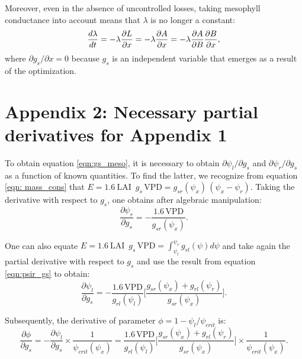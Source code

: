 \documentclass[utf8]{frontiersSCNS} %
\begin{document}
Moreover, even in the absence of uncontrolled losses, taking mesophyll conductance into account means that $\lambda$ is no longer a constant:
\begin{equation}
    \label{eqn:lam_meso}
    \frac{d \lambda}{dt} =-\lambda \frac{\partial L}{\partial x}\\
    = - \lambda \frac{\partial A}{\partial x}
    = - \lambda \frac{\partial A}{\partial B} \frac{\partial B}{\partial x},
\end{equation}
where $\partial g_s / \partial x=0$ because $g_s$ is an independent variable that emerges as a result of the optimization.

\section*{Appendix 2: Necessary partial derivatives for Appendix 1}

To obtain equation \ref{eqn:gs_meso}, it is necessary to obtain $\partial \psi_l / \partial g_s$ and $\partial \psi_r / \partial g_s$ as a function of known quantities. To find the latter, we recognize from equation \ref{eqn: mass_cons} that $E = 1.6\: \text{LAI }\, g_s\, \text{VPD} = g_{sr}(\psi_x)\, (\psi_x - \psi_r) $. Taking the derivative with respect to $g_s$, one obtains after algebraic manipulation:
\begin{equation}
    \label{eqn:psir_gs}
    \frac{\partial \psi_r}{\partial g_s} = - \frac{1.6 \, \text{VPD}}{g_{sr}(\psi_x)}.
\end{equation}

One can also equate $E = 1.6\: \text{LAI }\, g_s\, \text{VPD} = \int_{\psi_l}^{\psi_r} g_{rl}(\psi) d\psi $ and take again the partial derivative with respect to $g_s$ and use the result from equation \ref{eqn:psir_gs} to obtain:
\begin{equation}
    \label{eqn:psil_gs}
    \frac{\partial \psi_l}{\partial g_s} = - \frac{1.6 \, \text{VPD}}{g_{rl}(\psi_l)} \Bigg[\frac{g_{sr}(\psi_x) + g_{rl}(\psi_r)}{g_{sr}(\psi_x)} \Bigg].
\end{equation}

Subsequently, the derivative of parameter $\phi = 1 - \psi_l / \psi_{crit}$ is:
\begin{equation}
    \label{eqn:phi_gs}
    \frac{\partial \phi}{\partial g_s} = - \frac{\partial \psi_l}{\partial g_s} \times \frac{1}{\psi_{crit}(\psi_x)} = \frac{1.6 \, \text{VPD}}{g_{rl}(\psi_l)} \Bigg[\frac{g_{sr}(\psi_x) + g_{rl}(\psi_r)}{g_{sr}(\psi_x)} \Bigg] \times \frac{1}{\psi_{crit}(\psi_x)}.
\end{equation}
\end{document}
